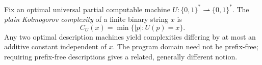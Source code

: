 
Fix an optimal universal partial computable machine $U:\{0,1\}^*\rightharpoonup\{0,1\}^*$. The \emph{plain Kolmogorov complexity} of a finite binary string $x$ is
\[
C_U(x)=\min\{|p|:U(p)=x\}.
\]
Any two optimal description machines yield complexities differing by at most an additive constant independent of $x$. The program domain need not be prefix-free; requiring prefix-free descriptions gives a related, generally different notion.
